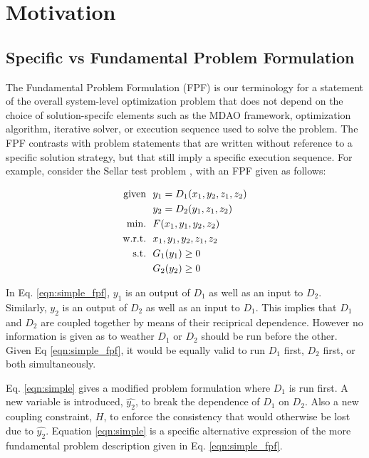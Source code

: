 \section{Motivation}
\subsection{Specific vs Fundamental Problem Formulation }
	\label{s:specific vs fundamental}
    The Fundamental Problem Formulation (FPF) is our terminology for a 
    statement of the overall system-level optimization problem that does not 
    depend on the choice of solution-specifc elements such as the MDAO 
    framework, optimization algorithm, iterative solver, or execution sequence
    used to solve the problem. The FPF contrasts with problem statements that are written without 
    reference to a specific solution strategy, but that still imply a specific execution sequence.
    For example, consider the Sellar test problem \cite{AIAA:sellar}, with an FPF given as follows:

    \begin{align}
        \textrm{given} & \ \ y_1 = D_1(x_1,y_2,z_1,z_2) \notag
        \\      & \ \ y_2 = D_2(y_1,z_1,z_2) \notag
        \\\textrm{min.} &\ \ F(x_1,y_1,y_2,z_2) \notag
        \\\textrm{w.r.t.} & \ \ x_1,y_1,y_2,z_1,z_2 \notag
        \\\textrm{s.t.} & \ \ G_1(y_1) \geq 0 \notag
        \\     & \ \ G_2(y_2) \geq 0
        \label{eqn:simple_fpf}
    \end{align}

    
    In Eq. \ref{eqn:simple_fpf}, $y_1$ is an output of $D_1$ as well as an input 
    to $D_2$. Similarly, $y_2$ is an output of $D_2$ as well as an input 
    to $D_1$. This implies that $D_1$ and $D_2$ are coupled together by means 
    of their reciprical dependence. However no information is given as to weather
    $D_1$ or $D_2$ should be run before the other. Given Eq \ref{eqn:simple_fpf}, 
    it would be equally valid to run $D_1$ first, $D_2$ first, or both simultaneously. 

    Eq. \ref{eqn:simple} gives a modified problem formulation where $D_1$ is run 
    first. A new variable is introduced, $\hat{y_2}$, to break the dependence of
    $D_1$ on $D_2$. Also a new coupling constraint, $H$, to enforce the consistency
    that would otherwise be lost due to $\hat{y_2}$. Equation \ref{eqn:simple} is 
    a specific alternative expression of the more fundamental problem description 
    given in Eq. \ref{eqn:simple_fpf}.

